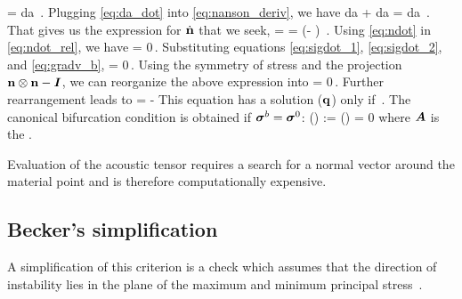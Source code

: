            = \left[\Tr(\Grad{\Bv}) - \Bn \cdot \Grad{\Bv} \cdot \Bn \right] da \,.
\Eeq
Plugging \eqref{eq:da_dot} into \eqref{eq:nanson_deriv}, we have
\Beq 
  \Bal
  \dot{\Bn} da + 
  \Bn \left[\Tr(\Grad{\Bv}) - \Bn \cdot \BdT \cdot \Bn \right] da 
  = \Bn \cdot \left[\Tr(\Grad{\Bv}) \BI - \Grad{\Bv} \right] da \,.
  \Eal
\Eeq
That gives us the expression for $\dot{\mathbf{n}}$ that we seek,
\Beq \label{eq:ndot}
  \dot{\Bn} = \Bn \cdot \left[\BdT \cdot (\Bn \otimes \Bn) - \Grad{\Bv}\right] 
            = \Bn \cdot \Grad{\Bv} \cdot \left(\Bn \otimes \Bn - \BI\right)  \,.
\Eeq
Using \eqref{eq:ndot} in \eqref{eq:ndot_rel}, we have
\Beq 
  \Bn \cdot {} = 0\,.
\Eeq
Substituting equations \eqref{eq:sigdot_1}, \eqref{eq:sigdot_2}, and \eqref{eq:gradv_b},
\Beq 
  \Bn \cdot {} = 0\,.
\Eeq
Using the symmetry of stress and the projection $\mathbf{n}\otimes\mathbf{n} - \boldsymbol{I}$, we can reorganize
the above expression into 
\Beq 
  \Bn \cdot {} = 0\,.
\Eeq
Further rearrangement leads to
\Beq
   \cdot \Bq  =  -\Bn \cdot {} 
\Eeq
This equation has a solution ($\mathbf{q}$) only if 
\Beq
  \det{}  \,.
\Eeq
The canonical bifurcation condition is obtained if $\boldsymbol{\sigma}^b = \boldsymbol{\sigma}^0$:
\Beq \label{eq:acoustic_tensor}
  \det(\BA) := \det(\Bn \cdot \SfC \cdot \Bn) = 0 
\Eeq
where $\boldsymbol{A}$ is the .

Evaluation of the acoustic tensor requires a search for a normal vector 
around the material point and is therefore computationally expensive.  

\subsection{Becker's simplification}
A simplification of this criterion is a check which assumes that the direction 
of instability lies in the plane of the maximum and minimum principal 
stress~\cite{Becker2002}.  

